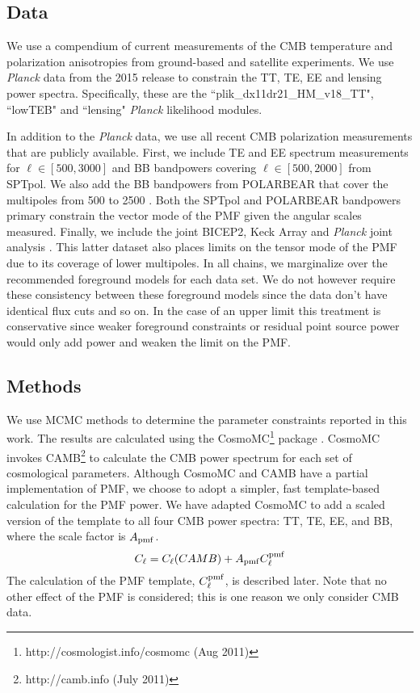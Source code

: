\documentclass[preprint]{emulateapj}
\newcommand{\cpmf}{\ensuremath{C_{\ell}^{\rm pmf}}}
\newcommand{\apmf}{\ensuremath{A_{\rm pmf}}}
\newcommand{\be}{\begin{equation}}
\newcommand{\ee}{\end{equation}}
\newcommand{\planck}{{\sl Planck}}
\newcommand{\pb}{POLARBEAR}
\newcommand{\sptpol}{SPTpol}
\begin{document}
\subsection{Data}

We use a compendium of current measurements of the CMB temperature and polarization anisotropies from ground-based and satellite experiments. 
We use \planck{} data from the 2015 release to constrain the TT, TE, EE and lensing power spectra. 
Specifically, these are the ``plik\_dx11dr21\_HM\_v18\_TT", ``lowTEB" and ``lensing" \planck{} likelihood modules. 


In addition to the \planck{} data, we use all recent CMB polarization measurements that are publicly available. 
First, we include TE and EE spectrum measurements\citep{crites15} for $\ell \in [500,3000]$ and BB bandpowers covering $\ell \in [500,2000]$ \citep{keisler15} from SPTpol. 
We also add the BB bandpowers from \pb{} that cover the multipoles from 500 to 2500 \citep{pb-bb15}. 
Both the \sptpol{} and \pb{} bandpowers primary constrain the vector mode of the PMF given the angular scales measured. 
Finally, we include the joint BICEP2, Keck Array and \planck{} joint analysis \citep{bicepkeckplanck15}. 
This latter dataset also places limits on the tensor mode of the PMF due to its coverage of lower multipoles. 
In all chains, we marginalize over the recommended foreground models for each data set. 
We do not however require these consistency between these foreground models since the data don't have identical flux cuts and so on. 
In the case of an upper limit this treatment is conservative since weaker foreground constraints or residual point source power would only add power and weaken the limit on the PMF. 

\subsection{Methods}

We use MCMC methods to determine the parameter constraints reported in this work. 
The results are calculated using  the {\textsc CosmoMC}\footnote{http://cosmologist.info/cosmomc (Aug 2011)} package \citep{lewis02b}. 
CosmoMC invokes  CAMB\footnote{http://camb.info (July 2011)}  \citep{lewis00} to calculate the CMB power spectrum for each set of cosmological parameters. 
Although CosmoMC and CAMB have a partial implementation of PMF, we choose to adopt a simpler, fast template-based calculation for the PMF power. 
We have adapted CosmoMC to add a scaled version of the template to all four CMB power spectra: TT, TE, EE, and BB, where the scale factor is \apmf. 
\be
C_\ell = C_\ell (CAMB) + \apmf \cpmf
\ee
The calculation of the PMF template, \cpmf, is described later. 
Note that no other effect of the PMF is considered; this is one reason we only consider CMB data.
\end{document}
